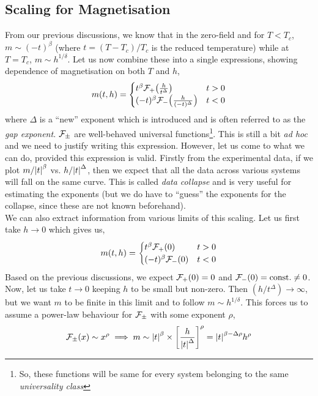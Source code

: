\subsection{Scaling for Magnetisation}
From our previous discussions, we know that in the zero-field and for $T<T_c$, $m\sim (-t)^\beta$ (where $t= (T-T_c)/T_c$ is the reduced temperature) while at $T=T_c$, $m\sim h^{1/\delta}$. Let us now combine these into a single expressions, showing dependence of magnetisation on both $T$ and $h$,
\begin{equation}
   m(t,h) = \begin{cases}
        t^\beta \mathcal F_+\qty(\frac{h}{t^\Delta}) & t>0 \\
        (-t)^\beta \mathcal F_-\qty(\frac{h}{(-t)^\Delta}) & t<0
    \end{cases}
\end{equation}
where $\Delta$ is a ``new'' exponent which is introduced and is often referred to as the \textit{gap exponent}. $\mathcal F_{\pm}$ are well-behaved universal functions\footnote{So, these functions will be same for every system belonging to the same \textit{universality class}}. This is still a bit \textit{ad hoc} and we need to justify writing this expression. However, let us come to what we can do, provided this expression is valid. Firstly from the experimental data, if we plot $m/\abs{t}^\beta$ vs. $h/\abs{t}^\Delta$, then we expect that all the data across various systems will fall on the same curve. This is called \textit{data collapse} and is very useful for estimating the exponents (but we do have to ``guess'' the exponents for the collapse, since these are not known beforehand).\\[0.2cm]
We can also extract information from various limits of this scaling. Let us first take $h\to 0$ which gives us,
\begin{equation*}
   m(t,h) = \begin{cases}
        t^\beta \mathcal F_+\qty(0) & t>0 \\
        (-t)^\beta \mathcal F_-\qty(0) & t<0
    \end{cases}
\end{equation*}
Based on the previous discussions, we expect $\mathcal F_+(0) = 0$ and $\mathcal F_-(0)= \text{const.} \neq 0$. Now, let us take $t\to 0$ keeping $h$ to be small but non-zero. Then $(h/t^{\Delta})\to \infty$, but we want $m$ to be finite in this limit and to follow $m\sim h^{1/\delta}$. This forces us to assume a power-law behaviour for $\mathcal F_{\pm}$ with some exponent $\rho$, 
$$\mathcal F_{\pm}(x) \sim x^\rho\implies m \sim \abs{t}^{\beta}\times \qty[\frac{h}{\abs{t}^\Delta}]^{\rho} = \abs{t}^{\beta-\Delta \rho} h^{\rho }  $$
